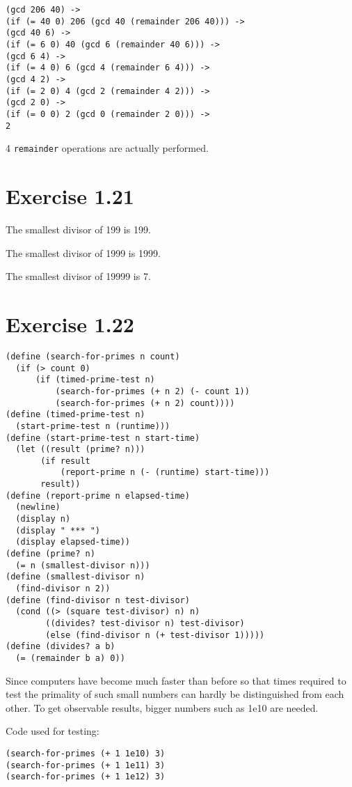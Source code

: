 \documentclass[../main.tex]{subfiles}
\begin{document}
\begin{lstlisting}
(gcd 206 40) ->
(if (= 40 0) 206 (gcd 40 (remainder 206 40))) ->
(gcd 40 6) ->
(if (= 6 0) 40 (gcd 6 (remainder 40 6))) ->
(gcd 6 4) ->
(if (= 4 0) 6 (gcd 4 (remainder 6 4))) ->
(gcd 4 2) ->
(if (= 2 0) 4 (gcd 2 (remainder 4 2))) ->
(gcd 2 0) ->
(if (= 0 0) 2 (gcd 0 (remainder 2 0))) ->
2
\end{lstlisting}

4 \lstinline{remainder} operations are actually performed.

\section{Exercise 1.21}

The smallest divisor of 199 is 199.

The smallest divisor of 1999 is 1999.

The smallest divisor of 19999 is 7.

\section{Exercise 1.22}

\begin{lstlisting}
(define (search-for-primes n count)
  (if (> count 0)
      (if (timed-prime-test n)
          (search-for-primes (+ n 2) (- count 1))
          (search-for-primes (+ n 2) count))))
(define (timed-prime-test n)
  (start-prime-test n (runtime)))
(define (start-prime-test n start-time)
  (let ((result (prime? n)))
       (if result
           (report-prime n (- (runtime) start-time)))
       result))
(define (report-prime n elapsed-time)
  (newline)
  (display n)
  (display " *** ")
  (display elapsed-time))
(define (prime? n)
  (= n (smallest-divisor n)))
(define (smallest-divisor n)
  (find-divisor n 2))
(define (find-divisor n test-divisor)
  (cond ((> (square test-divisor) n) n)
        ((divides? test-divisor n) test-divisor)
        (else (find-divisor n (+ test-divisor 1)))))
(define (divides? a b)
  (= (remainder b a) 0))
\end{lstlisting}

Since computers have become much faster than before so that
 times required to test the primality of such small numbers
 can hardly be distinguished from each other. To get observable
 results, bigger numbers such as 1e10 are needed.

Code used for testing:

\begin{lstlisting}
(search-for-primes (+ 1 1e10) 3)
(search-for-primes (+ 1 1e11) 3)
(search-for-primes (+ 1 1e12) 3)
\end{lstlisting}
\end{document}
